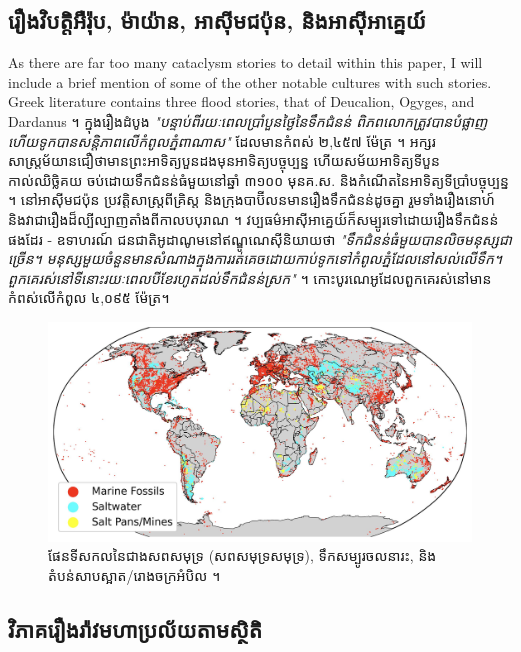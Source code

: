 \documentclass[10pt,twocolumn,letterpaper]{article}
\begin{document}
\subsection{រឿងវិបត្តិអឺរ៉ុប, ម៉ាយ៉ាន, អាស៊ីមជប៉ុន, និងអាស៊ីអាគ្នេយ៍}

As there are far too many cataclysm stories to detail within this paper, I will include a brief mention of some of the other notable cultures with such stories. Greek literature contains three flood stories, that of Deucalion, Ogyges, and Dardanus \cite{9,10}។ ក្នុងរឿងដំបូង \textit{"បន្ទាប់ពីរយៈពេលប្រាំបួនថ្ងៃនៃទឹកជំនន់ ពិភពលោកត្រូវបានបំផ្លាញ ហើយទូកបានសន្តិភាពលើកំពូលភ្នំពាណាស"} ដែលមានកំពស់ ២,៤៥៧ ម៉ែត្រ \cite{11}។ អក្សរសាស្ត្រម័យានជឿថាមានព្រះអាទិត្យ​បួនដងមុនអាទិត្យបច្ចុប្បន្ន ហើយសម័យអាទិត្យទីបួន កាល់ឈិច្លិគយ ចប់ដោយទឹកជំនន់ធំមួយនៅឆ្នាំ ៣១០០ មុនគ.ស. និងកំណើតនៃអាទិត្យទីប្រាំបច្ចុប្បន្ន \cite{12}។ នៅអាស៊ីមជប៉ុន ប្រវត្តិសាស្ត្រពីគ្រិស្ត និងក្រុងបាប៊ីលនមានរឿងទឹកជំនន់ដូចគ្នា រួមទាំងរឿងនោហ៍ និងវាជារឿងដ៏ល្បីល្បាញតាំងពីកាលប​បុរាណ \cite{13}។ វប្បធម៌អាស៊ីអាគ្នេយ៍ក៏សម្បូរទៅដោយរឿងទឹកជំនន់ផងដែរ - ឧទាហរណ៍ ជនជាតិអូដាណូមនៅឥណ្ឌូណេស៊ីនិយាយថា \textit{"ទឹកជំនន់ធំមួយបានលិចមនុស្សជាច្រើន។ មនុស្សមួយចំនួនមានសំណាងក្នុងការរត់គេចដោយកាប់ទូកទៅកំពូលភ្នំដែលនៅសល់លើទឹក។ ពួកគេរស់នៅទីនោះរយៈពេលបីខែរហូតដល់ទឹកជំនន់ស្រក"} \cite{3}។ កោះបូរណេអូដែលពួកគេរស់នៅមានកំពស់លើកំពូល ៤,០៩៥ ម៉ែត្រ។

\begin{figure}[b]
\begin{center}

\includegraphics[width=1\textwidth]{marine.jpg}
\end{center}
   \caption{ផែនទីសកលនៃជាងសពសមុទ្រ (សពសមុទ្រសមុទ្រ), ទឹកសម្បូរចលនារះ, និងតំបន់សាបស្អាត/រោងចក្រអំបិល \cite{15,16,86,87}។}
   \label{fig:2}
\end{figure}

\subsection{វិភាគរឿងរ៉ាវមហាប្រល័យតាមស្ថិតិ}
\end{document}
